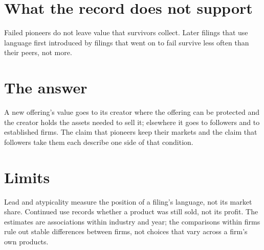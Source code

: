 \section*{What the record does not support}

Failed pioneers do not leave value that survivors collect. Later filings
that use language first introduced by filings that went on to fail
survive less often than their peers, not more.

\section*{The answer}

A new offering's value goes to its creator where the offering can be
protected and the creator holds the assets needed to sell it; elsewhere
it goes to followers and to established firms. The claim that pioneers
keep their markets and the claim that followers take them each describe
one side of that condition.

\section*{Limits}

Lead and atypicality measure the position of a filing's language, not
its market share. Continued use records whether a product was still
sold, not its profit. The estimates are associations within industry and
year; the comparisons within firms rule out stable differences between
firms, not choices that vary across a firm's own products.



